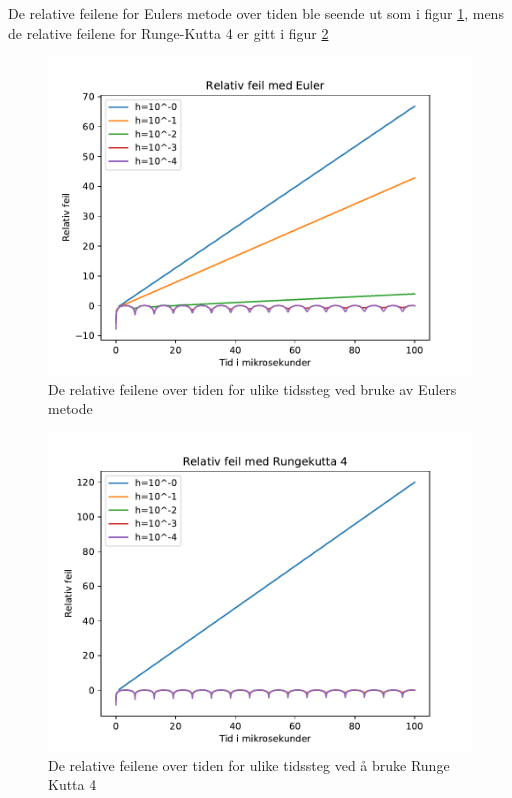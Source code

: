 \documentclass[reprint,english,notitlepage]{revtex4-1}  %
\begin{document}
De relative feilene for Eulers metode over tiden ble seende ut som i figur \ref{errEu}, mens de relative feilene for Runge-Kutta 4 er gitt i figur \ref{errRK4}
\begin{figure}[H]
	\label{errEu}
	\centering 
	\includegraphics[scale=0.4]{../pythonplots/RelerrEu.pdf}
	\caption{De relative feilene over tiden for ulike tidssteg ved bruke av Eulers metode}
\end{figure}
\begin{figure}[H]
	\label{errRK4}
	\centering 
	\includegraphics[scale=0.4]{../pythonplots/RelerrRK4.pdf}
	\caption{De relative feilene over tiden for ulike tidssteg ved å bruke Runge Kutta 4}
\end{figure}
\end{document}
